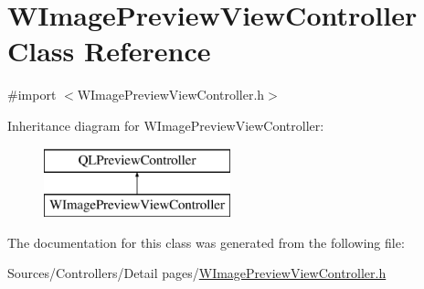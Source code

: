 \hypertarget{interface_w_image_preview_view_controller}{\section{W\-Image\-Preview\-View\-Controller Class Reference}
\label{interface_w_image_preview_view_controller}
}


{\ttfamily \#import $<$W\-Image\-Preview\-View\-Controller.\-h$>$}

Inheritance diagram for W\-Image\-Preview\-View\-Controller\-:\begin{figure}[H]
\begin{center}
\leavevmode
\includegraphics[height=2.000000cm]{interface_w_image_preview_view_controller}
\end{center}
\end{figure}


The documentation for this class was generated from the following file\-:\begin{DoxyCompactItemize}
\item 
Sources/\-Controllers/\-Detail pages/\hyperlink{_w_image_preview_view_controller_8h}{W\-Image\-Preview\-View\-Controller.\-h}\end{DoxyCompactItemize}
